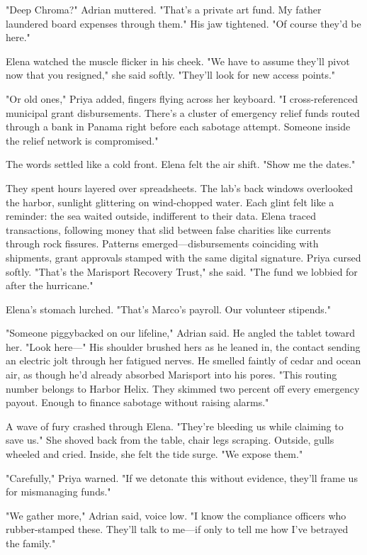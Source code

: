 "Deep Chroma?" Adrian muttered. "That's a private art fund. My father laundered board expenses through them." His jaw tightened. "Of course they'd be here."

Elena watched the muscle flicker in his cheek. "We have to assume they'll pivot now that you resigned," she said softly. "They'll look for new access points."

"Or old ones," Priya added, fingers flying across her keyboard. "I cross-referenced municipal grant disbursements. There's a cluster of emergency relief funds routed through a bank in Panama right before each sabotage attempt. Someone inside the relief network is compromised."

The words settled like a cold front. Elena felt the air shift. "Show me the dates."

They spent hours layered over spreadsheets. The lab's back windows overlooked the harbor, sunlight glittering on wind-chopped water. Each glint felt like a reminder: the sea waited outside, indifferent to their data. Elena traced transactions, following money that slid between false charities like currents through rock fissures. Patterns emerged—disbursements coinciding with shipments, grant approvals stamped with the same digital signature. Priya cursed softly. "That's the Marisport Recovery Trust," she said. "The fund we lobbied for after the hurricane."

Elena's stomach lurched. "That's Marco's payroll. Our volunteer stipends."

"Someone piggybacked on our lifeline," Adrian said. He angled the tablet toward her. "Look here—" His shoulder brushed hers as he leaned in, the contact sending an electric jolt through her fatigued nerves. He smelled faintly of cedar and ocean air, as though he'd already absorbed Marisport into his pores. "This routing number belongs to Harbor Helix. They skimmed two percent off every emergency payout. Enough to finance sabotage without raising alarms."

A wave of fury crashed through Elena. "They're bleeding us while claiming to save us." She shoved back from the table, chair legs scraping. Outside, gulls wheeled and cried. Inside, she felt the tide surge. "We expose them."

"Carefully," Priya warned. "If we detonate this without evidence, they'll frame us for mismanaging funds."

"We gather more," Adrian said, voice low. "I know the compliance officers who rubber-stamped these. They'll talk to me—if only to tell me how I've betrayed the family."

